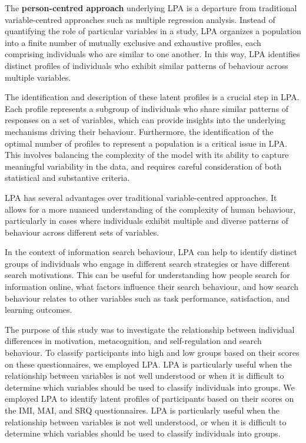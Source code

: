 \documentclass[letterpaper, nobind]{templates/ociamthesis}
\begin{document}
The \textbf{person-centred approach} underlying LPA is a departure from traditional variable-centred approaches such as multiple regression analysis. Instead of quantifying the role of particular variables in a study, LPA organizes a population into a finite number of mutually exclusive and exhaustive profiles, each comprising individuals who are similar to one another. In this way, LPA identifies distinct profiles of individuals who exhibit similar patterns of behaviour across multiple variables.

The identification and description of these latent profiles is a crucial step in LPA. Each profile represents a subgroup of individuals who share similar patterns of responses on a set of variables, which can provide insights into the underlying mechanisms driving their behaviour. Furthermore, the identification of the optimal number of profiles to represent a population is a critical issue in LPA. This involves balancing the complexity of the model with its ability to capture meaningful variability in the data, and requires careful consideration of both statistical and substantive criteria.

LPA has several advantages over traditional variable-centred approaches. It allows for a more nuanced understanding of the complexity of human behaviour, particularly in cases where individuals exhibit multiple and diverse patterns of behaviour across different sets of variables.

In the context of information search behaviour, LPA can help to identify distinct groups of individuals who engage in different search strategies or have different search motivations. This can be useful for understanding how people search for information online, what factors influence their search behaviour, and how search behaviour relates to other variables such as task performance, satisfaction, and learning outcomes.

The purpose of this study was to investigate the relationship between individual differences in motivation, metacognition, and self-regulation and search behaviour.
To classify participants into high and low groups based on their scores on these questionnaires, we employed LPA.
LPA is particularly useful when the relationship between variables is not well understood or when it is difficult to determine which variables should be used to classify individuals into groups.
We employed LPA to identify latent profiles of participants based on their scores on the IMI, MAI, and SRQ questionnaires.
LPA is particularly useful when the relationship between variables is not well understood, or when it is difficult to determine which variables should be used to classify individuals into groups.
\end{document}
